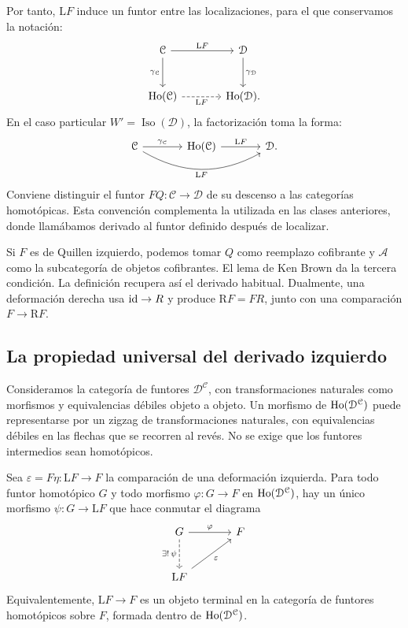 Por tanto, $\mathrm LF$ induce un funtor entre las localizaciones, para el que conservamos la notación:
\[
\begin{tikzcd}[column sep=large,row sep=large]
\mathcal C\arrow[r,"\mathrm LF"]\arrow[d,"\gamma_{\mathcal C}"']
&\mathcal D\arrow[d,"\gamma_{\mathcal D}"]\\
\Ho(\mathcal C)\arrow[r,dashed,"\mathrm LF"']&\Ho(\mathcal D).
\end{tikzcd}
\]
En el caso particular $W'=\operatorname{Iso}(\mathcal D)$, la factorización toma la forma:
\[
\begin{tikzcd}[column sep=large,row sep=large]
\mathcal C\arrow[r,"\gamma_{\mathcal C}"]\arrow[rr,bend right=30,"\mathrm LF"']
&\Ho(\mathcal C)\arrow[r,"\mathrm LF"]&\mathcal D.
\end{tikzcd}
\]
Conviene distinguir el funtor $FQ\colon\mathcal C\to\mathcal D$ de su descenso a las categorías homotópicas. Esta convención complementa la utilizada en las clases anteriores, donde llamábamos derivado al funtor definido después de localizar.

Si $F$ es de Quillen izquierdo, podemos tomar $Q$ como reemplazo cofibrante y $\mathcal A$ como la subcategoría de objetos cofibrantes. El lema de Ken Brown da la tercera condición. La definición recupera así el derivado habitual. Dualmente, una deformación derecha usa $\operatorname{id}\to R$ y produce $\mathrm RF=FR$, junto con una comparación $F\to\mathrm RF$.

\subsection{La propiedad universal del derivado izquierdo}

Consideramos la categoría de funtores $\mathcal D^{\mathcal C}$, con transformaciones naturales como morfismos y equivalencias débiles objeto a objeto. Un morfismo de $\operatorname{Ho}(\mathcal D^{\mathcal C})$ puede representarse por un zigzag de transformaciones naturales, con equivalencias débiles en las flechas que se recorren al revés. No se exige que los funtores intermedios sean homotópicos.

\begin{teo}\label{teo:c16-universal-derivado}
Sea $\varepsilon=F\eta\colon\mathrm LF\to F$ la comparación de una deformación izquierda. Para todo funtor homotópico $G$ y todo morfismo $\varphi\colon G\to F$ en $\operatorname{Ho}(\mathcal D^{\mathcal C})$, hay un único morfismo $\psi\colon G\to\mathrm LF$ que hace conmutar el diagrama
\[
\begin{tikzcd}[column sep=large,row sep=large]
G\arrow[r,"\varphi"]\arrow[d,dashed,"\exists!\,\psi"']&F\\
\mathrm LF\arrow[ur,"\varepsilon"']&
\end{tikzcd}
\]
Equivalentemente, $\mathrm LF\to F$ es un objeto terminal en la categoría de funtores homotópicos sobre $F$, formada dentro de $\operatorname{Ho}(\mathcal D^{\mathcal C})$.
\end{teo}

